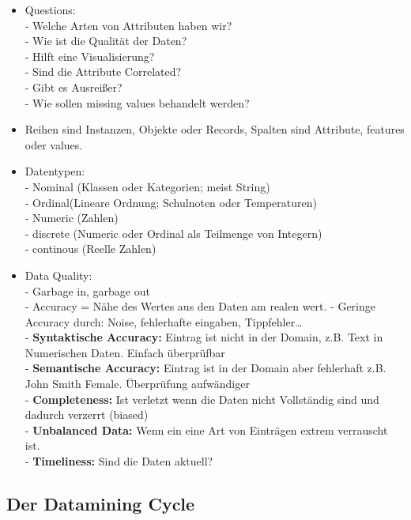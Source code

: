 \documentclass[a4paper]{scrartcl}
\begin{document}
\begin{itemize}
\item Questions:\\
- Welche Arten von Attributen haben wir?\\
- Wie ist die Qualität der Daten?\\
- Hilft eine Visualisierung?\\
- Sind die Attribute Correlated?\\
- Gibt es Ausreißer?\\
- Wie sollen missing values behandelt werden?\\
\item Reihen sind Instanzen, Objekte oder Records, Spalten sind Attribute, features oder values.
\item Datentypen:\\
- Nominal (Klassen oder Kategorien; meist String)\\
- Ordinal(Lineare Ordnung; Schulnoten oder Temperaturen)\\
- Numeric (Zahlen)\\
- discrete (Numeric oder Ordinal als Teilmenge von Integern)\\
- continous (Reelle Zahlen)\\
\item Data Quality:\\
- Garbage in, garbage out\\
- Accuracy = Nähe des Wertes aus den Daten am realen wert.
- Geringe Accuracy durch: Noise, fehlerhafte eingaben, Tippfehler\dots\\
- \textbf{Syntaktische Accuracy:} Eintrag ist nicht in der Domain, z.B. Text in Numerischen Daten. Einfach überprüfbar\\
- \textbf{Semantische Accuracy:} Eintrag ist in der Domain aber fehlerhaft z.B. John Smith Female. Überprüfung aufwändiger\\
- \textbf{Completeness:} Ist verletzt wenn die Daten nicht Vollständig sind und dadurch verzerrt (biased)\\
- \textbf{Unbalanced Data:} Wenn ein eine Art von Einträgen extrem verrauscht ist.\\
- \textbf{Timeliness:} Sind die Daten aktuell?\\
\end{itemize}

\subsection{Der Datamining Cycle}

\end{document}
